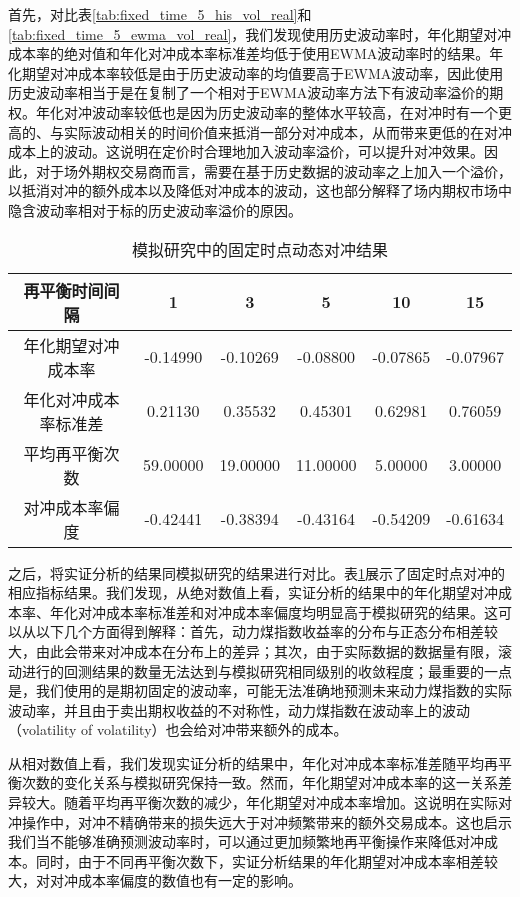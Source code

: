 首先，对比表\ref{tab:fixed_time_5_his_vol_real}和\ref{tab:fixed_time_5_ewma_vol_real}，我们发现使用历史波动率时，年化期望对冲成本率的绝对值和年化对冲成本率标准差均低于使用EWMA波动率时的结果。年化期望对冲成本率较低是由于历史波动率的均值要高于EWMA波动率，因此使用历史波动率相当于是在复制了一个相对于EWMA波动率方法下有波动率溢价的期权。年化对冲波动率较低也是因为历史波动率的整体水平较高，在对冲时有一个更高的、与实际波动相关的时间价值来抵消一部分对冲成本，从而带来更低的在对冲成本上的波动。这说明在定价时合理地加入波动率溢价，可以提升对冲效果。因此，对于场外期权交易商而言，需要在基于历史数据的波动率之上加入一个溢价，以抵消对冲的额外成本以及降低对冲成本的波动，这也部分解释了场内期权市场中隐含波动率相对于标的历史波动率溢价的原因。

\begin{table}[htbp]
  \centering
  \caption{模拟研究中的固定时点动态对冲结果}
  \label{tab:fixed_time_5_sim}
  \begin{tabular}{cccccc}
    \toprule
    再平衡时间间隔 & 1 & 3 & 5 & 10 & 15 \\
    \midrule
    年化期望对冲成本率 & -0.14990 & -0.10269 & -0.08800 & -0.07865 & -0.07967 \\
    年化对冲成本率标准差 & 0.21130 & 0.35532 & 0.45301 & 0.62981 & 0.76059 \\
    平均再平衡次数 & 59.00000 & 19.00000 & 11.00000 & 5.00000 & 3.00000 \\
    对冲成本率偏度 & -0.42441 & -0.38394 & -0.43164 & -0.54209 & -0.61634 \\
    \bottomrule
  \end{tabular}
\end{table}

之后，将实证分析的结果同模拟研究的结果进行对比。表\ref{tab:fixed_time_5_sim}展示了固定时点对冲的相应指标结果。我们发现，从绝对数值上看，实证分析的结果中的年化期望对冲成本率、年化对冲成本率标准差和对冲成本率偏度均明显高于模拟研究的结果。这可以从以下几个方面得到解释：首先，动力煤指数收益率的分布与正态分布相差较大，由此会带来对冲成本在分布上的差异；其次，由于实际数据的数据量有限，滚动进行的回测结果的数量无法达到与模拟研究相同级别的收敛程度；最重要的一点是，我们使用的是期初固定的波动率，可能无法准确地预测未来动力煤指数的实际波动率，并且由于卖出期权收益的不对称性，动力煤指数在波动率上的波动（volatility of volatility）也会给对冲带来额外的成本。

从相对数值上看，我们发现实证分析的结果中，年化对冲成本率标准差随平均再平衡次数的变化关系与模拟研究保持一致。然而，年化期望对冲成本率的这一关系差异较大。随着平均再平衡次数的减少，年化期望对冲成本率增加。这说明在实际对冲操作中，对冲不精确带来的损失远大于对冲频繁带来的额外交易成本。这也启示我们当不能够准确预测波动率时，可以通过更加频繁地再平衡操作来降低对冲成本。同时，由于不同再平衡次数下，实证分析结果的年化期望对冲成本率相差较大，对对冲成本率偏度的数值也有一定的影响。

